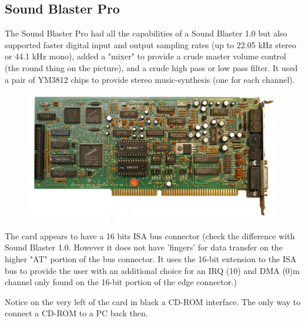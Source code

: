 \documentclass[book.tex]{subfiles}
\begin{document}
  \subsection{Sound Blaster Pro}
The Sound Blaster Pro had all the capabilities of a Sound Blaster 1.0 but also supported faster digital input and output sampling rates (up to 22.05 kHz stereo or 44.1 kHz mono), added a "mixer" to provide a crude master volume control (the round thing on the picture), and a crude high pass or low pass filter. It used a pair of YM3812 chips to provide stereo music-synthesis (one for each channel).\\
\begin{figure}[H] \centering \includegraphics[width=\textwidth]{imgs/hardware/sbpro.png} \end{figure}
 The card appears to have a 16 bits ISA bus connector (check the difference with Sound Blaster 1.0. However it does not have 'fingers' for data transfer on the higher "AT" portion of the bus connector. It uses the 16-bit extension to the ISA bus to provide the user with an additional choice for an IRQ (10) and DMA (0)m channel only found on the 16-bit portion of the edge connector.)\\
\par
{} Notice on the very left of the card in black a CD-ROM interface. The only way to connect a CD-ROM to a PC back then.
\end{document}
